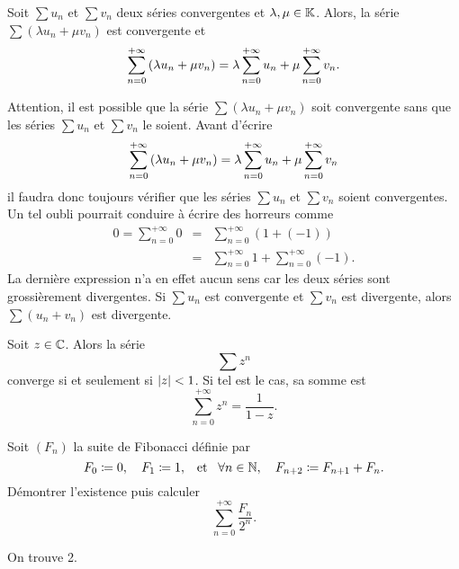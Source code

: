\documentclass{magnolia}
\begin{document}
\begin{proposition}
Soit $\sum u_n$ et $\sum v_n$ deux séries convergentes et
$\lambda,\mu\in\mathbb{K}$. Alors, la série \mbox{$\sum (\lambda u_n+\mu v_n)$} est convergente et
\[\sum_{n=0}^{+\infty} \left(\lambda u_n+\mu v_n\right)=\lambda\sum_{n=0}^{+\infty} u_n
  +\mu\sum_{n=0}^{+\infty} v_n.\]
\end{proposition}

\begin{remarques}
\remarque Attention, il est possible que la série $\sum (\lambda u_n+\mu v_n)$ soit convergente
  sans que les séries $\sum u_n$ et $\sum v_n$ le soient. Avant d'écrire
  \[\sum_{n=0}^{+\infty} \left(\lambda u_n+\mu v_n\right)=\lambda\sum_{n=0}^{+\infty} u_n
    +\mu\sum_{n=0}^{+\infty} v_n\]
  il faudra donc toujours vérifier que les séries $\sum u_n$ et $\sum v_n$ soient convergentes.
  Un tel oubli pourrait conduire à écrire des horreurs comme
  \begin{eqnarray*}
  0 = \sum_{n=0}^{+\infty} 0 &=& \sum_{n=0}^{+\infty} (1+(-1))\\
  &=& \sum_{n=0}^{+\infty} 1 + \sum_{n=0}^{+\infty} (-1).
  \end{eqnarray*}
  La dernière expression n'a en effet aucun sens car les deux séries sont grossièrement divergentes.
\remarque Si $\sum u_n$ est convergente et $\sum v_n$ est divergente, alors
  $\sum (u_n+v_n)$ est divergente.
\end{remarques}



\begin{proposition}
Soit $z\in\mathbb{C}$. Alors la série
\[\sum z^n\]
converge si et seulement si $\left|z\right|<1$. Si tel est le cas, sa somme est
\[\sum_{n=0}^{+\infty} z^n = \frac{1}{1-z}.\]
\end{proposition}

\begin{exoUnique}
\exo Soit $(F_n)$ la suite de Fibonacci définie par
  \[F_0\coloneqq 0, \quad F_1\coloneqq 1, \quad\!\text{et}\quad\! \forall n\in\mathbb{N} ,\quad F_{n+2}\coloneqq F_{n+1}+F_n.\]
  Démontrer l'existence puis calculer
  \[\sum_{n=0}^{+\infty} \frac{F_n}{2^n}.\]
\begin{sol}
On trouve 2.
\end{sol}
\end{exoUnique}
\end{document}
